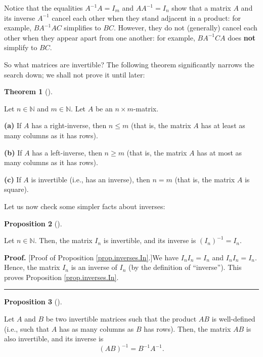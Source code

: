 \documentclass[numbers=enddot,12pt,final,onecolumn,notitlepage]{scrartcl}%
\theoremstyle{definition}
\newtheorem{theo}{Theorem}[section]
\newenvironment{theorem}[1][]
{\begin{theo}[#1]\begin{leftbar}}
{\end{leftbar}\end{theo}}
\newtheorem{prop}[theo]{Proposition}
\newenvironment{proposition}[1][]
{\begin{prop}[#1]\begin{leftbar}}
{\end{leftbar}\end{prop}}
\newenvironment{proof}[1][Proof]{\noindent\textbf{#1.} }{\ \rule{0.5em}{0.5em}}
\begin{document}
Notice that the equalities $A^{-1}A=I_{m}$ and $AA^{-1}=I_{n}$ show that a
matrix $A$ and its inverse $A^{-1}$ cancel each other when they stand adjacent
in a product: for example, $BA^{-1}AC$ simplifies to $BC$. However, they do
not (generally) cancel each other when they appear apart from one another: for
example, $BA^{-1}CA$ does \textbf{not} simplify to $BC$.

So what matrices are invertible? The following theorem significantly narrows
the search down; we shall not prove it until later:

\begin{theorem}
\label{thm.invertible.size}Let $n\in\mathbb{N}$ and $m\in\mathbb{N}$. Let $A$
be an $n\times m$-matrix.

\textbf{(a)} If $A$ has a right-inverse, then $n\leq m$ (that is, the matrix
$A$ has at least as many columns as it has rows).

\textbf{(b)} If $A$ has a left-inverse, then $n\geq m$ (that is, the matrix
$A$ has at most as many columns as it has rows).

\textbf{(c)} If $A$ is invertible (i.e., has an inverse), then $n=m$ (that is,
the matrix $A$ is square).
\end{theorem}

Let us now check some simpler facts about inverses:

\begin{proposition}
\label{prop.inverses.In}Let $n\in\mathbb{N}$. Then, the matrix $I_{n}$ is
invertible, and its inverse is $\left(  I_{n}\right)  ^{-1}=I_{n}$.
\end{proposition}

\begin{proof}
[Proof of Proposition \ref{prop.inverses.In}.]We have $I_{n}I_{n}=I_{n}$ and
$I_{n}I_{n}=I_{n}$. Hence, the matrix $I_{n}$ is an inverse of $I_{n}$ (by the
definition of \textquotedblleft inverse\textquotedblright). This proves
Proposition \ref{prop.inverses.In}.
\end{proof}

\begin{proposition}
\label{prop.inverses.AB}Let $A$ and $B$ be two invertible matrices such that
the product $AB$ is well-defined (i.e., such that $A$ has as many columns as
$B$ has rows). Then, the matrix $AB$ is also invertible, and its inverse is
\begin{equation}
\left(  AB\right)  ^{-1}=B^{-1}A^{-1}. \label{eq.prop.inverses.AB.eq}%
\end{equation}

\end{proposition}
\end{document}
